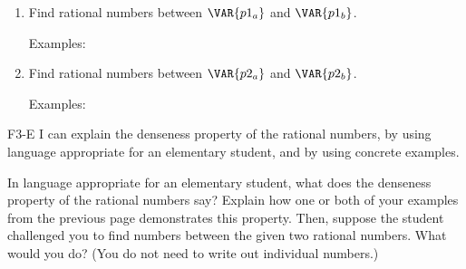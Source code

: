 
\begin{enumerate}
    \item Find  rational numbers between $\VAR{p1_a}$ and $\VAR{p1_b}$. 

    \vfill


    \vfill
    \begin{ansenv}
        Examples:\newline
        \vspace{12pt}
    \end{ansenv}
    \vfill

    \item Find  rational numbers between $\VAR{p2_a}$ and $\VAR{p2_b}$.

    \vfill
    \vfill
    \begin{ansenv}
        Examples:\newline
        \vspace{12pt}
    \end{ansenv}
    \vfill
    \vfill
\end{enumerate}

\newpage

\begin{setskill}{F3-E}
    I can explain the denseness property of the rational numbers, by using language appropriate for an elementary student, and by using concrete examples.
\end{setskill}

In language appropriate for an elementary student, what does the denseness property of the rational numbers say? Explain how one or both of your examples from the previous page demonstrates this property. Then, suppose the student challenged you to find  numbers between the given two rational numbers. What would you do? (You do not need to write out  individual numbers.)